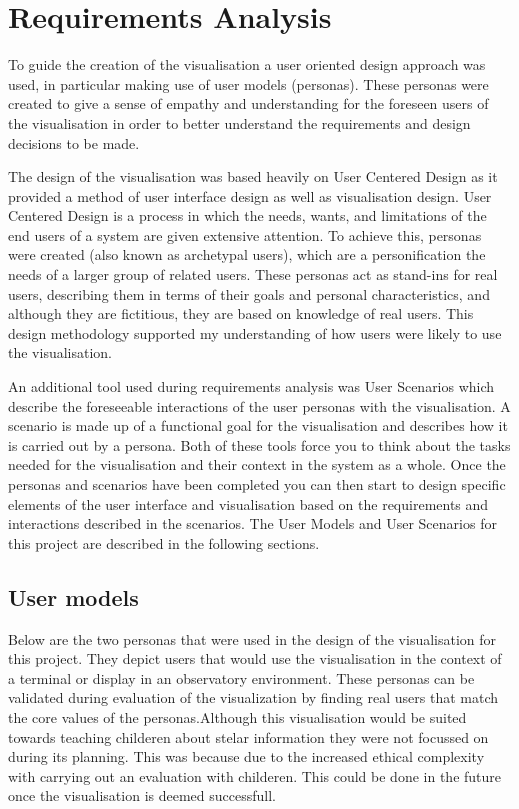 \chapter{Requirements Analysis}\label{Chap:ra}
To guide the creation of the visualisation a user oriented design approach was
used, in particular making use of user models (personas). These personas were
created to give a sense of empathy and understanding for the foreseen users of
the visualisation in order to better understand the requirements and design
decisions to be made. 

The design of the visualisation was based heavily on User Centered Design as it
provided a method of user interface design as well as visualisation design. User
Centered Design is a process in which the needs, wants, and limitations of the
end users of a system are given extensive attention. To achieve this, personas
were created (also known as archetypal users), which are a personification the
needs of a larger group of related users. These personas act as stand-ins for
real users, describing them in terms of their goals and personal
characteristics, and although they are fictitious, they are based on knowledge
of real users. This design methodology supported my understanding of how users
were likely to use the visualisation.

An additional tool used during requirements analysis was User Scenarios which
describe the foreseeable interactions of the user personas with the
visualisation. A scenario is made up of a functional goal for the visualisation
and describes how it is carried out by a persona. Both of these tools force you
to think about the tasks needed for the visualisation and their context in the
system as a whole. Once the personas and scenarios have been completed you can
then start to design specific elements of the user interface and visualisation
based on the requirements and interactions described in the scenarios. The User
Models and User Scenarios for this project are described in the following
sections.


\section{User models}
Below are the two personas that were used in the design of the visualisation for
this project. They depict users that would use the visualisation in the context
of a terminal or display in an observatory environment. These personas  can be
validated during evaluation of the visualization by finding real users that
match the core values of the personas.Although this visualisation would be
suited towards teaching childeren about stelar information they were not
focussed on during its planning. This was because due to the increased ethical
complexity with carrying out an evaluation with childeren. This could be done in
the future once the visualisation is deemed successfull. 

